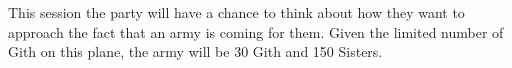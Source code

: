 This session the party will have a chance to think about how they want to approach the fact that an army is coming for them.
Given the limited number of Gith on this plane, the army will be 30 Gith and 150 Sisters.
